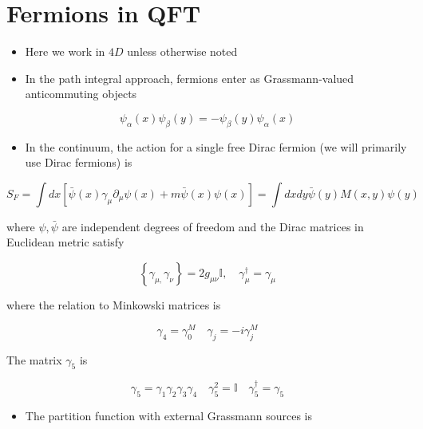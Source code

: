 \section{Fermions in QFT}

\begin{itemize}
\item  Here we work in $4D$ unless otherwise noted
  \item In the path integral approach, fermions enter as Grassmann-valued anticommuting objects
\end{itemize}

\begin{equation}
\psi_{\alpha}(x) \psi_{\beta}(y)=-\psi_{\beta}(y) \psi_{\alpha}(x)
\end{equation}

\begin{itemize}
  \item In the continuum, the action for a single free Dirac fermion (we will primarily use Dirac fermions) is
\end{itemize}

\begin{equation}
S_{F}=\int d x\left[\bar{\psi}(x) \gamma_{\mu} \partial_{\mu} \psi(x)+m \bar{\psi}(x) \psi(x)\right]=\int d x d y \bar{\psi}(y) M(x, y) \psi(y)
\end{equation}

where \(\psi, \bar{\psi}\) are independent degrees of freedom and the Dirac matrices in Euclidean metric satisfy

\begin{equation}
\left\{\gamma_{\mu,} \gamma_{\nu}\right\}=2 g_{\mu \nu} \mathbb{I}, \quad \gamma_{\mu}^{\dagger}=\gamma_{\mu}
\end{equation}

where the relation to Minkowski matrices is

\begin{equation}
\gamma_{4}=\gamma_{0}^{M} \quad \gamma_{j}=-i \gamma_{j}^{M}
\end{equation}

The matrix $\gamma_5$ is

\begin{equation}
\gamma_{5}=\gamma_{1} \gamma_{2} \gamma_{3} \gamma_{4} \quad \gamma_{5}^{2}=\mathbb{I} \quad \gamma_{5}^{\dagger}=\gamma_{5}
\end{equation}

\begin{itemize}
  \item The partition function with external Grassmann sources is
\end{itemize}

